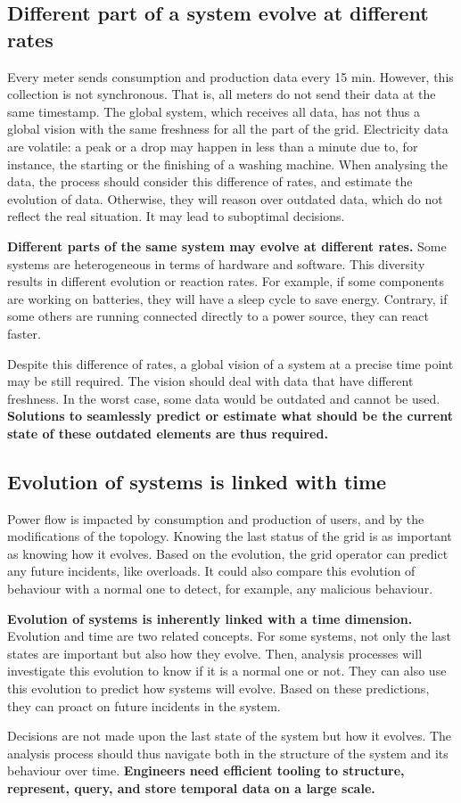 \subsection{Different part of a system evolve at different rates}
Every meter sends consumption and production data every 15 min.
However, this collection is not synchronous.
That is, all meters do not send their data at the same timestamp.
The global system, which receives all data, has not thus a global vision with the same freshness for all the part of the grid.
Electricity data are volatile: a peak or a drop may happen in less than a minute due to, for instance, the starting or the finishing of a washing machine.
When analysing the data, the process should consider this difference of rates, and estimate the evolution of data.
Otherwise, they will reason over outdated data, which do not reflect the real situation.
It may lead to suboptimal decisions.

\textbf{Different parts of the same system may evolve at different rates.}
Some systems are heterogeneous in terms of hardware and software.
This diversity results in different evolution or reaction rates.
For example, if some components are working on batteries, they will have a sleep cycle to save energy.
Contrary, if some others are running connected directly to a power source, they can react faster.

Despite this difference of rates, a global vision of a system at a precise time point may be still required.
The vision should deal with data that have different freshness.
In the worst case, some data would be outdated and cannot be used.
\textbf{Solutions to seamlessly predict or estimate what should be the current state of these outdated elements are thus required.}


\subsection{Evolution of systems is linked with time}
Power flow is impacted by consumption and production of users, and by the modifications of the topology.
Knowing the last status of the grid is as important as knowing how it evolves.
Based on the evolution, the grid operator can predict any future incidents, like overloads.
It could also compare this evolution of behaviour with a normal one to detect, for example, any malicious behaviour.

\textbf{Evolution of systems is inherently linked with a time dimension.}
Evolution and time are two related concepts.
For some systems, not only the last states are important but also how they evolve.
Then, analysis processes will investigate this evolution to know if it is a normal one or not.
They can also use this evolution to predict how systems will evolve.
Based on these predictions, they can proact on future incidents in the system.

Decisions are not made upon the last state of the system but how it evolves.
The analysis process should thus navigate both in the structure of the system and its behaviour over time.
\textbf{Engineers need efficient tooling to structure, represent, query, and store temporal data on a large scale.}